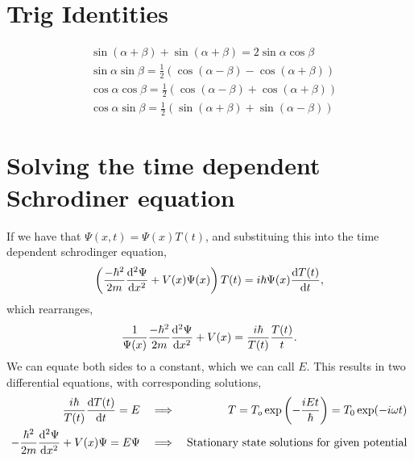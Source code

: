 \documentclass{book}
\begin{document}
\chapter{Trig Identities}
\begin{align}
	& \sin(\alpha + \beta) + \sin(\alpha + \beta) = 2\sin\alpha\cos\beta \label{id1}\\
	& \sin\alpha\sin\beta = \frac{1}{2} (\cos(\alpha - \beta) - \cos(\alpha + \beta)) \\
	&\cos\alpha\cos\beta = \frac{1}{2} (\cos(\alpha - \beta) + \cos(\alpha + \beta)) \\
	& \cos\alpha\sin\beta = \frac{1}{2} (\sin(\alpha + \beta) + \sin(\alpha - \beta))
\end{align}
\chapter{Solving the time dependent Schrodiner equation}
If we have that $\Psi(x,t) = \Psi(x)T(t)$, and substituing this into the time dependent schrodinger equation,
\begin{equation}
	\left(\frac{-\hbar^2}{2m}\dv[2]{\Psi}{x} + V(x)\Psi(x)\right)T(t) = i\hbar\Psi(x) \dv{T(t)}{t},
\end{equation}
which rearranges,
\begin{equation}
	\frac{1}{\Psi(x)}\frac{-\hbar^2}{2m}\dv[2]{\Psi}{x} + V(x) = \frac{i\hbar}{T(t)}\frac{T(t)}{t}.
\end{equation}
We can equate both sides to a constant, which we can call $E$. This results in two differential equations, with corresponding solutions,
\begin{align}
	\frac{i\hbar}{T(t)}\dv{T(t)}{t} = E && \implies && T=T_o\exp\left(-\frac{iEt}{\hbar}\right) = T_0\exp(-i\omega t) \\
	-\frac{\hbar^2}{2m}\dv[2]{\Psi}{x} + V(x)\Psi = E\Psi && \implies && \text{Stationary state solutions for given potential}
\end{align}
\end{document}
